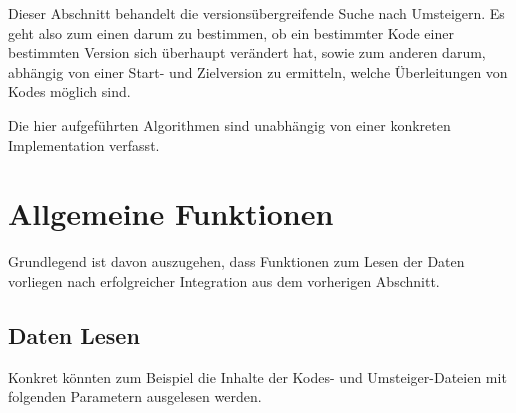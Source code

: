 Dieser Abschnitt behandelt die versionsübergreifende Suche nach Umsteigern. Es geht also zum einen darum zu bestimmen, ob ein bestimmter Kode einer bestimmten Version sich überhaupt verändert hat, sowie zum anderen darum, abhängig von einer Start- und Zielversion zu ermitteln, welche Überleitungen von Kodes möglich sind. 

Die hier aufgeführten Algorithmen sind unabhängig von einer konkreten Implementation verfasst. 

\section{Allgemeine Funktionen}

Grundlegend ist davon auszugehen, dass Funktionen zum Lesen der Daten vorliegen nach erfolgreicher Integration aus dem vorherigen Abschnitt. 

\subsection{Daten Lesen}
\label{function-read-data}

Konkret könnten zum Beispiel die Inhalte der Kodes- und Umsteiger-Dateien mit folgenden Parametern ausgelesen werden. 


